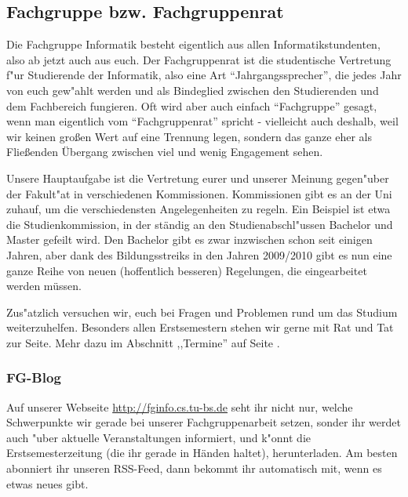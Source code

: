 \subsection{Fachgruppe bzw. Fachgruppenrat}
\label{fachgruppe}

Die Fachgruppe Informatik besteht eigentlich aus allen 
Informatikstundenten, also ab jetzt auch aus euch. Der Fachgruppenrat 
ist die studentische Vertretung f"ur Studierende der Informatik, also 
eine Art "`Jahrgangssprecher"', die jedes Jahr von euch gew"ahlt werden 
und als Bindeglied zwischen den Studierenden und dem Fachbereich 
fungieren. Oft wird aber auch einfach "`Fachgruppe"' gesagt, wenn man 
eigentlich vom "`Fachgruppenrat"' spricht - vielleicht auch deshalb, 
weil wir keinen großen Wert auf eine Trennung legen, sondern das ganze
eher als Fließenden Übergang zwischen viel und wenig Engagement sehen.

Unsere Hauptaufgabe ist die Vertretung eurer und unserer Meinung 
gegen"uber der Fakult"at in verschiedenen Kommissionen. Kommissionen 
gibt es an der Uni zuhauf, um die verschiedensten Angelegenheiten zu 
regeln. Ein Beispiel ist etwa die Studienkommission, in der ständig 
an den Studienabschl"ussen Bachelor und Master gefeilt wird. Den Bachelor 
gibt es zwar inzwischen schon seit einigen Jahren, aber dank des 
Bildungsstreiks in den Jahren 2009/2010 gibt es nun eine ganze Reihe %
von neuen (hoffentlich besseren) Regelungen, die eingearbeitet werden 
müssen.

Zus"atzlich versuchen wir, euch bei Fragen und Problemen rund um das 
Studium weiterzuhelfen. Besonders allen Erstsemestern stehen wir 
gerne mit Rat und Tat zur Seite.  Mehr dazu im Abschnitt ,,Termine'' auf
Seite \pageref{termine}.

\subsubsection*{FG-Blog}

Auf unserer Webseite \url{http://fginfo.cs.tu-bs.de} seht ihr nicht 
nur, welche Schwerpunkte wir gerade bei unserer Fachgruppenarbeit setzen, 
sonder ihr werdet auch "uber aktuelle Veranstaltungen informiert, und k"onnt 
die Erstsemesterzeitung (die ihr gerade in Händen haltet), herunterladen. 
Am besten abonniert ihr unseren RSS-Feed, dann bekommt ihr automatisch 
mit, wenn es etwas neues gibt.

